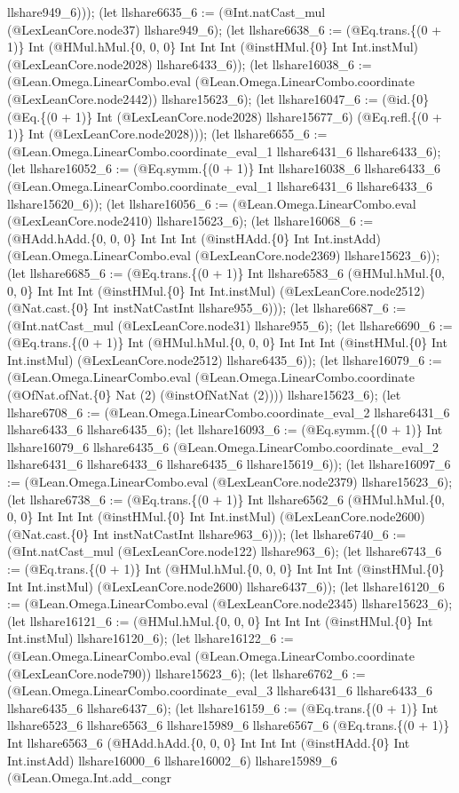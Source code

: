 \documentclass[11pt]{article}
\begin{document}
llshare949\_6))); (let llshare6635\_6 := (@Int.natCast\_mul (@LexLeanCore.node37) llshare949\_6); (let llshare6638\_6 := (@Eq.trans.\{(0 + 1)\} Int (@HMul.hMul.\{0, 0, 0\} Int Int Int (@instHMul.\{0\} Int Int.instMul) (@LexLeanCore.node2028) llshare6433\_6)); (let llshare16038\_6 := (@Lean.Omega.LinearCombo.eval (@Lean.Omega.LinearCombo.coordinate (@LexLeanCore.node2442)) llshare15623\_6); (let llshare16047\_6 := (@id.\{0\} (@Eq.\{(0 + 1)\} Int (@LexLeanCore.node2028) llshare15677\_6) (@Eq.refl.\{(0 + 1)\} Int (@LexLeanCore.node2028))); (let llshare6655\_6 := (@Lean.Omega.LinearCombo.coordinate\_eval\_1 llshare6431\_6 llshare6433\_6); (let llshare16052\_6 := (@Eq.symm.\{(0 + 1)\} Int llshare16038\_6 llshare6433\_6 (@Lean.Omega.LinearCombo.coordinate\_eval\_1 llshare6431\_6 llshare6433\_6 llshare15620\_6)); (let llshare16056\_6 := (@Lean.Omega.LinearCombo.eval (@LexLeanCore.node2410) llshare15623\_6); (let llshare16068\_6 := (@HAdd.hAdd.\{0, 0, 0\} Int Int Int (@instHAdd.\{0\} Int Int.instAdd) (@Lean.Omega.LinearCombo.eval (@LexLeanCore.node2369) llshare15623\_6)); (let llshare6685\_6 := (@Eq.trans.\{(0 + 1)\} Int llshare6583\_6 (@HMul.hMul.\{0, 0, 0\} Int Int Int (@instHMul.\{0\} Int Int.instMul) (@LexLeanCore.node2512) (@Nat.cast.\{0\} Int instNatCastInt llshare955\_6))); (let llshare6687\_6 := (@Int.natCast\_mul (@LexLeanCore.node31) llshare955\_6); (let llshare6690\_6 := (@Eq.trans.\{(0 + 1)\} Int (@HMul.hMul.\{0, 0, 0\} Int Int Int (@instHMul.\{0\} Int Int.instMul) (@LexLeanCore.node2512) llshare6435\_6)); (let llshare16079\_6 := (@Lean.Omega.LinearCombo.eval (@Lean.Omega.LinearCombo.coordinate (@OfNat.ofNat.\{0\} Nat (2) (@instOfNatNat (2)))) llshare15623\_6); (let llshare6708\_6 := (@Lean.Omega.LinearCombo.coordinate\_eval\_2 llshare6431\_6 llshare6433\_6 llshare6435\_6); (let llshare16093\_6 := (@Eq.symm.\{(0 + 1)\} Int llshare16079\_6 llshare6435\_6 (@Lean.Omega.LinearCombo.coordinate\_eval\_2 llshare6431\_6 llshare6433\_6 llshare6435\_6 llshare15619\_6)); (let llshare16097\_6 := (@Lean.Omega.LinearCombo.eval (@LexLeanCore.node2379) llshare15623\_6); (let llshare6738\_6 := (@Eq.trans.\{(0 + 1)\} Int llshare6562\_6 (@HMul.hMul.\{0, 0, 0\} Int Int Int (@instHMul.\{0\} Int Int.instMul) (@LexLeanCore.node2600) (@Nat.cast.\{0\} Int instNatCastInt llshare963\_6))); (let llshare6740\_6 := (@Int.natCast\_mul (@LexLeanCore.node122) llshare963\_6); (let llshare6743\_6 := (@Eq.trans.\{(0 + 1)\} Int (@HMul.hMul.\{0, 0, 0\} Int Int Int (@instHMul.\{0\} Int Int.instMul) (@LexLeanCore.node2600) llshare6437\_6)); (let llshare16120\_6 := (@Lean.Omega.LinearCombo.eval (@LexLeanCore.node2345) llshare15623\_6); (let llshare16121\_6 := (@HMul.hMul.\{0, 0, 0\} Int Int Int (@instHMul.\{0\} Int Int.instMul) llshare16120\_6); (let llshare16122\_6 := (@Lean.Omega.LinearCombo.eval (@Lean.Omega.LinearCombo.coordinate (@LexLeanCore.node790)) llshare15623\_6); (let llshare6762\_6 := (@Lean.Omega.LinearCombo.coordinate\_eval\_3 llshare6431\_6 llshare6433\_6 llshare6435\_6 llshare6437\_6); (let llshare16159\_6 := (@Eq.trans.\{(0 + 1)\} Int llshare6523\_6 llshare6563\_6 llshare15989\_6 llshare6567\_6 (@Eq.trans.\{(0 + 1)\} Int llshare6563\_6 (@HAdd.hAdd.\{0, 0, 0\} Int Int Int (@instHAdd.\{0\} Int Int.instAdd) llshare16000\_6 llshare16002\_6) llshare15989\_6 (@Lean.Omega.Int.add\_congr 
\end{document}
